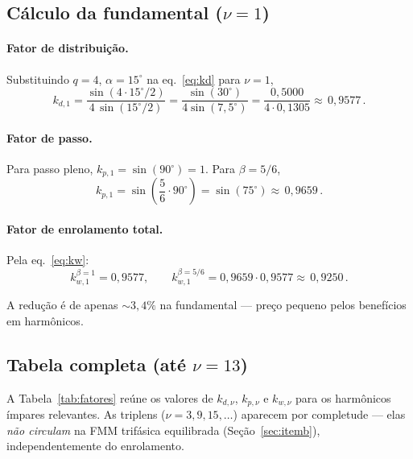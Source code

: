 \documentclass[12pt,a4paper]{article}
\newcommand{\eqimp}[1]{\boxed{\,#1\,}}
\begin{document}
\subsection{Cálculo da fundamental ($\nu=1$)}

\paragraph{Fator de distribuição.} Substituindo $q=4$, $\alpha=15^{\circ}$ na eq.~\eqref{eq:kd} para $\nu=1$,
\[
k_{d,1} = \frac{\sin(4\cdot 15^{\circ}/2)}{4\,\sin(15^{\circ}/2)}
       = \frac{\sin(30^{\circ})}{4\sin(7{,}5^{\circ})}
       = \frac{0{,}5000}{4\cdot 0{,}1305}
       \approx \eqimp{0{,}9577}.
\]

\paragraph{Fator de passo.} Para passo pleno, $k_{p,1}=\sin(90^{\circ})=1$. Para $\beta=5/6$,
\[
k_{p,1} = \sin\!\left(\frac{5}{6}\cdot 90^{\circ}\right) = \sin(75^{\circ}) \approx \eqimp{0{,}9659}.
\]

\paragraph{Fator de enrolamento total.} Pela eq.~\eqref{eq:kw}:
\[
k_{w,1}^{\beta=1}\!=\!0{,}9577,\qquad
k_{w,1}^{\beta=5/6}\!=\!0{,}9659\cdot 0{,}9577 \approx \eqimp{0{,}9250}.
\]

\noindent A redução é de apenas \(\sim 3{,}4\%\) na fundamental --- preço pequeno pelos benefícios em harmônicos.

\subsection{Tabela completa (até $\nu=13$)}

A Tabela~\ref{tab:fatores} reúne os valores de $k_{d,\nu}$, $k_{p,\nu}$ e $k_{w,\nu}$ para os harmônicos ímpares relevantes. As triplens ($\nu=3,9,15,\ldots$) aparecem por completude --- elas \emph{não circulam} na FMM trifásica equilibrada (Seção~\ref{sec:itemb}), independentemente do enrolamento.
\end{document}
